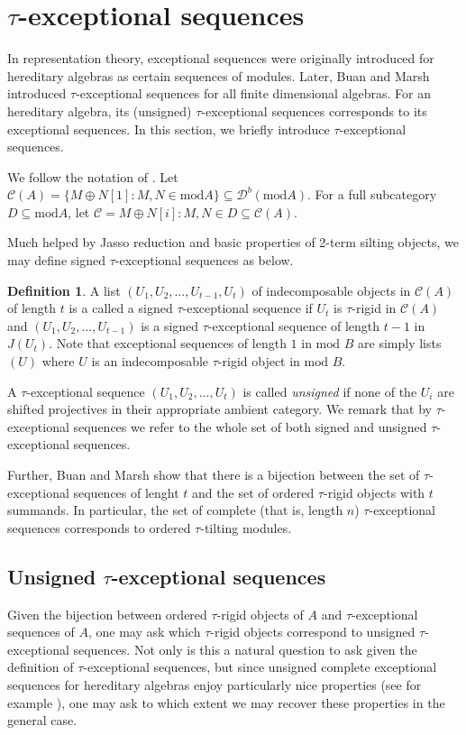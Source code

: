 \documentclass[]{article}
\theoremstyle{definition}
\newtheorem{definition}{Definition}[section]
\newcommand{\tu}{\ensuremath{\tau}}
\begin{document}
\section{\tu-exceptional sequences}
In representation theory, exceptional sequences were originally introduced for hereditary algebras\cite{cbw92}\cite{ringel_exceptional} as certain sequences of modules. Later, Buan and Marsh introduced \tu-exceptional sequences\cite{buantau2020} for all finite dimensional algebras. For an hereditary algebra, its (unsigned) \tu-exceptional sequences corresponds to its exceptional sequences. In this section, we briefly introduce \tu-exceptional sequences. 

We follow the notation of \cite{buantau2020}. Let $\mathcal{C}(A) = \{M \oplus N[1] : M,N \in \text{mod} A\} \subseteq \mathcal{D}^b(\text{mod} A)$. For a full subcategory $D \subseteq \text{mod} A$, let $\mathcal{C} = {M \oplus N[i] : M,N \in D} \subseteq \mathcal{C}(A)$.

Much helped by Jasso reduction and basic properties of 2-term silting objects, we may define signed \tu-exceptional sequences as below.

\begin{definition}
A list $(U_1,U_2,\dots,U_{t-1},U_t)$ of indecomposable objects in $\mathcal{C}(A)$ of length $t$ is a called a signed \tu-exceptional sequence if $U_t$ is $\tu$-rigid in $\mathcal{C}(A)$ and $(U_1,U_2,\dots,U_{t-1})$ is a signed \tu-exceptional sequence of length $t-1$ in $J(U_t)$. Note that exceptional sequences of length $1$ in $\text{mod } B$ are simply lists $(U)$ where $U$ is an indecomposable \tu-rigid object in $\text{mod } B$.
\end{definition} 

A \tu-exceptional sequence $(U_1,U_2,\dots,U_t)$ is called \textit{unsigned} if none of the $U_i$ are shifted projectives in their appropriate ambient category. We remark that by \tu-exceptional sequences we refer to the whole set of both signed and unsigned \tu-exceptional sequences.

Further, Buan and Marsh show that there is a bijection between the set of \tu-exceptional sequences of lenght $t$ and the set of ordered \tu-rigid objects with $t$ summands. In particular, the set of complete (that is, length $n$) \tu-exceptional sequences corresponds to ordered \tu-tilting modules.


\subsection{Unsigned \tu-exceptional sequences}
Given the bijection between ordered \tu-rigid objects of $A$ and \tu-exceptional sequences of $A$, one may ask which \tu-rigid objects correspond to unsigned \tu-exceptional sequences. Not only is this a natural question to ask given the definition of \tu-exceptional sequences, but since unsigned complete exceptional sequences for hereditary algebras enjoy particularly nice properties (see for example \cite{ringel_exceptional}), one may ask to which extent we may recover these properties in the general case.
\end{document}
